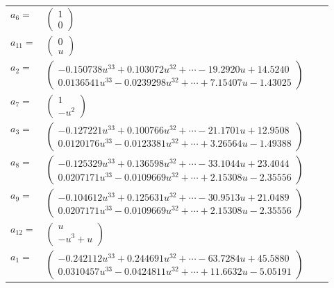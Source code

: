 \documentclass[1p]{elsarticle_modified}
\theoremstyle{definition}
\begin{document}
\begin{tabular}{m{7pt} m{180pt} m{7pt} m{180pt} }
\flushright $a_{6}=$&$\begin{pmatrix}1\\0\end{pmatrix}$ \\
\flushright $a_{11}=$&$\begin{pmatrix}0\\u\end{pmatrix}$ \\
\flushright $a_{2}=$&$\begin{pmatrix}-0.150738 u^{33}+0.103072 u^{32}+\cdots-19.2920 u+14.5240\\0.0136541 u^{33}-0.0239298 u^{32}+\cdots+7.15407 u-1.43025\end{pmatrix}$ \\
\flushright $a_{7}=$&$\begin{pmatrix}1\\- u^2\end{pmatrix}$ \\
\flushright $a_{3}=$&$\begin{pmatrix}-0.127221 u^{33}+0.100766 u^{32}+\cdots-21.1701 u+12.9508\\0.0120176 u^{33}-0.0123381 u^{32}+\cdots+3.26564 u-1.49388\end{pmatrix}$ \\
\flushright $a_{8}=$&$\begin{pmatrix}-0.125329 u^{33}+0.136598 u^{32}+\cdots-33.1044 u+23.4044\\0.0207171 u^{33}-0.0109669 u^{32}+\cdots+2.15308 u-2.35556\end{pmatrix}$ \\
\flushright $a_{9}=$&$\begin{pmatrix}-0.104612 u^{33}+0.125631 u^{32}+\cdots-30.9513 u+21.0489\\0.0207171 u^{33}-0.0109669 u^{32}+\cdots+2.15308 u-2.35556\end{pmatrix}$ \\
\flushright $a_{12}=$&$\begin{pmatrix}u\\- u^3+u\end{pmatrix}$ \\
\flushright $a_{1}=$&$\begin{pmatrix}-0.242112 u^{33}+0.244691 u^{32}+\cdots-63.7284 u+45.5880\\0.0310457 u^{33}-0.0424811 u^{32}+\cdots+11.6632 u-5.05191\end{pmatrix}$ \\

\end{tabular}
\end{document}

